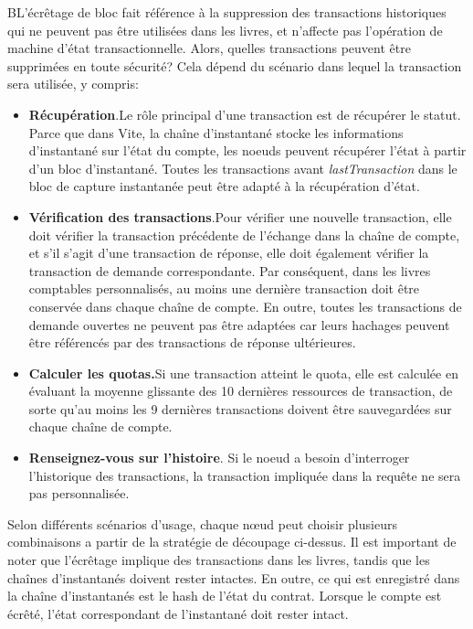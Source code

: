 \documentclass[UTF8,nofonts]{article}
\begin{document}
\begin{multicols}{2}
BL'écrêtage de bloc fait référence à la suppression des transactions historiques qui ne peuvent pas être utilisées dans les livres, et n'affecte pas l'opération de machine d'état transactionnelle. Alors, quelles transactions peuvent être supprimées en toute sécurité? Cela dépend du scénario dans lequel la transaction sera utilisée, y compris:


\begin{itemize}
\item \textbf{Récupération}.Le rôle principal d'une transaction est de récupérer le statut. Parce que dans Vite, la chaîne d'instantané stocke les informations d'instantané sur l'état du compte, les noeuds peuvent récupérer l'état à partir d'un bloc d'instantané. Toutes les transactions avant \textit{lastTransaction} dans le bloc de capture instantanée peut être adapté à la récupération d'état.
\item \textbf{Vérification des transactions}.Pour vérifier une nouvelle transaction, elle doit vérifier la transaction précédente de l'échange dans la chaîne de compte, et s'il s'agit d'une transaction de réponse, elle doit également vérifier la transaction de demande correspondante. Par conséquent, dans les livres comptables personnalisés, au moins une dernière transaction doit être conservée dans chaque chaîne de compte. En outre, toutes les transactions de demande ouvertes ne peuvent pas être adaptées car leurs hachages peuvent être référencés par des transactions de réponse ultérieures.
\item \textbf{Calculer les quotas.}Si une transaction atteint le quota, elle est calculée en évaluant la moyenne glissante des 10 dernières ressources de transaction, de sorte qu'au moins les 9 dernières transactions doivent être sauvegardées sur chaque chaîne de compte.
\item \textbf{Renseignez-vous sur l'histoire}. Si le noeud a besoin d'interroger l'historique des transactions, la transaction impliquée dans la requête ne sera pas personnalisée.
\end{itemize}

Selon différents scénarios d'usage, chaque nœud peut choisir plusieurs combinaisons a partir de la stratégie de découpage ci-dessus. Il est important de noter que l'écrêtage implique des transactions dans les livres, tandis que les chaînes d'instantanés doivent rester intactes. En outre, ce qui est enregistré dans la chaîne d'instantanés est le hash de l'état du contrat. Lorsque le compte est écrêté, l'état correspondant de l'instantané doit rester intact.


\end{multicols}
\end{document}
